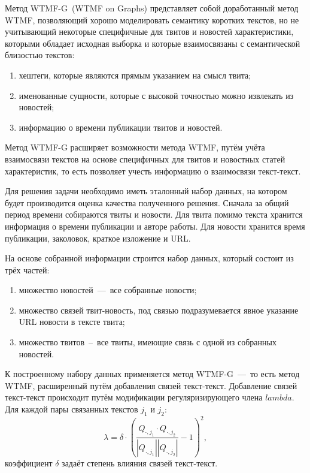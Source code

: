         Метод WTMF-G~(WTMF on Graphs) представляет собой доработанный метод WTMF, позволяющий хорошо моделировать семантику коротких текстов,
        но не учитывающий некоторые специфичные для твитов и новостей характеристики, которыми обладает исходная выборка и
        которые взаимосвязаны с семантической близостью текстов:
        \begin{enumerate}
            \item хештеги, которые являются прямым указанием на смысл твита;
            \item именованные сущности, которые с высокой точностью можно извлекать из новостей;
            \item информацию о времени публикации твитов и новостей.
        \end{enumerate}
        Метод WTMF-G расширяет возможности метода WTMF, путём учёта взаимосвязи текстов на основе специфичных для твитов и новостных статей характеристик,
        то есть позволяет учесть информацию о взаимосвязи текст-текст.

        Для решения задачи необходимо иметь эталонный набор данных, на котором будет производится оценка качества полученного решения.
        Сначала за общий период времени собираются твиты и новости.
        Для твита помимо текста хранится информация о времени публикации и авторе работы. Для новости хранится время публикации, заколовок, краткое изложение и URL.

        На основе собранной информации строится набор данных, который состоит из трёх частей:
        \begin{enumerate}
            \item множество новостей~---~все собранные новости;
            \item множество связей твит-новость, под связью подразумевается явное указание URL новости в тексте твита;
            \item множество твитов~--~все твиты, имеющие связь с одной из собранных новостей.
        \end{enumerate}
        К построенному набору данных применяется метод WTMF-G~---~то есть метод WTMF, расширенный путём добавления связей текст-текст.
        Добавление связей текст-текст происходит путём модификации регуляризирующего члена $lambda$. Для каждой пары связанных текстов $j_1$ и $j_2$:
        $$\lambda = \delta \cdot (\dfrac{Q_{\cdot,j_1}\cdot Q_{\cdot,j_2}}{|Q_{\cdot,j_1}|| Q_{\cdot,j_2}|}-1)^2,$$
        коэффициент $\delta$ задаёт степень влияния связей текст-текст.

